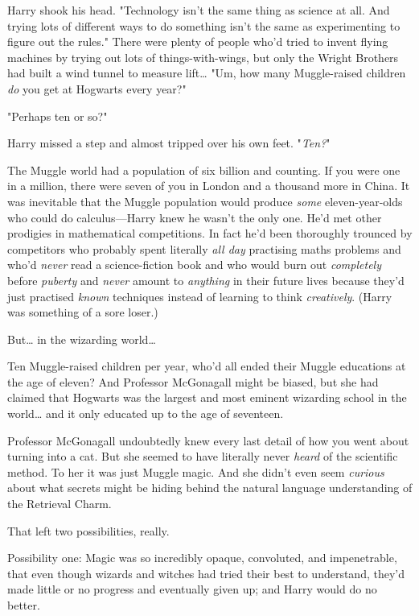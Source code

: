 Harry shook his head. "Technology isn't the same thing as science at all. And 
trying lots of different ways to do something isn't the same as experimenting 
to figure out the rules." There were plenty of people who'd tried to invent 
flying machines by trying out lots of things-with-wings, but only the Wright 
Brothers had built a wind tunnel to measure lift{\ldots} "Um, how many 
Muggle-raised children \emph{do} you get at Hogwarts every year?"

"Perhaps ten or so?"

Harry missed a step and almost tripped over his own feet. "\emph{Ten?}"

The Muggle world had a population of six billion and counting. If you were one 
in a million, there were seven of you in London and a thousand more in China. 
It was inevitable that the Muggle population would produce \emph{some} 
eleven-year-olds who could do calculus---Harry knew he wasn't the only one. 
He'd met other prodigies in mathematical competitions. In fact he'd been 
thoroughly trounced by competitors who probably spent literally \emph{all day} 
practising maths problems and who'd \emph{never} read a science-fiction book 
and who would burn out \emph{completely} before \emph{puberty} and \emph{never} 
amount to \emph{anything} in their future lives because they'd just practised 
\emph{known} techniques instead of learning to think \emph{creatively}. (Harry 
was something of a sore loser.)

But{\ldots} in the wizarding world{\ldots}

Ten Muggle-raised children per year, who'd all ended their Muggle educations at 
the age of eleven? And Professor McGonagall might be biased, but she had 
claimed that Hogwarts was the largest and most eminent wizarding school in the 
world{\ldots} and it only educated up to the age of seventeen.

Professor McGonagall undoubtedly knew every last detail of how you went about 
turning into a cat. But she seemed to have literally never \emph{heard} of the 
scientific method. To her it was just Muggle magic. And she didn't even seem 
\emph{curious} about what secrets might be hiding behind the natural language 
understanding of the Retrieval Charm.

That left two possibilities, really.

Possibility one: Magic was so incredibly opaque, convoluted, and impenetrable, 
that even though wizards and witches had tried their best to understand, they'd 
made little or no progress and eventually given up; and Harry would do no 
better.

